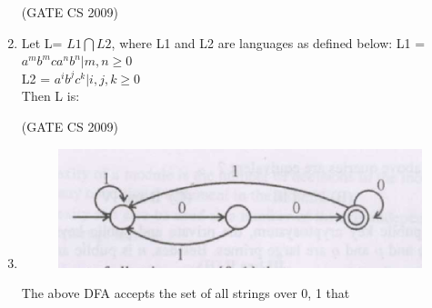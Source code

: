 \documentclass[a4paper, 11pt]{article}
\begin{document}
\begin{enumerate}
    \hfill (GATE CS 2009)

    \item  Let L= $L1\bigcap L2$, where L1 and L2 are languages as defined below:
    L1 = {$a^m b^m c a^n b^n | m,n \geq0$}\\
    L2 = {$a^i b^j c^k| i,j,k \geq0$}\\
    Then L is:\\

    \begin{enumerate}
    \end{enumerate}

    \hfill (GATE CS 2009)
    
    \item
    \begin{figure}[H]
        \centering
        \includegraphics[width=\columnwidth]{figs/q41.png}
        \caption{}
        \label{fig:placeholder}
    \end{figure}
        
    The above DFA accepts the set of all strings over {0, 1} that\\
    \begin{enumerate}
    \end{enumerate}


\end{enumerate}
\end{document}
